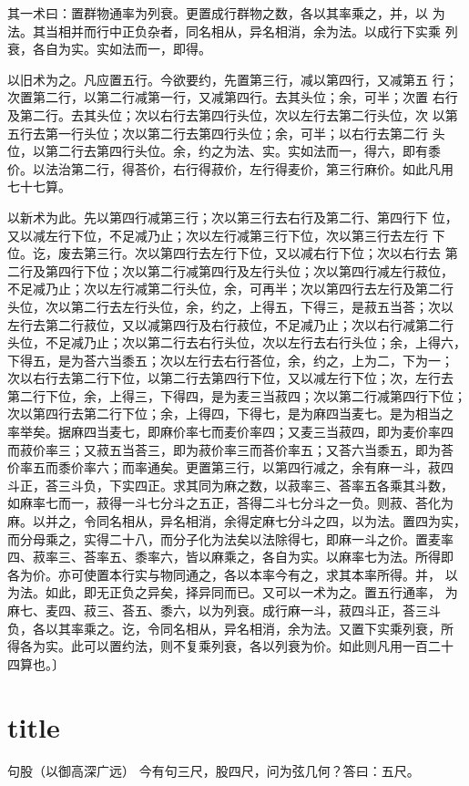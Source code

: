 \documentclass[a4paper,12pt,UTF8,twoside]{ctexbook}
\begin{document}
其一术曰：置群物通率为列衰。更置成行群物之数，各以其率乘之，并，以 为法。其当相并而行中正负杂者，同名相从，异名相消，余为法。以成行下实乘 列衰，各自为实。实如法而一，即得。

以旧术为之。凡应置五行。今欲要约，先置第三行，减以第四行，又减第五 行；次置第二行，以第二行减第一行，又减第四行。去其头位；余，可半；次置 右行及第二行。去其头位；次以右行去第四行头位，次以左行去第二行头位，次 以第五行去第一行头位；次以第二行去第四行头位；余，可半；以右行去第二行 头位，以第二行去第四行头位。余，约之为法、实。实如法而一，得六，即有黍 价。以法治第二行，得荅价，右行得菽价，左行得麦价，第三行麻价。如此凡用 七十七算。

以新术为此。先以第四行减第三行；次以第三行去右行及第二行、第四行下 位，又以减左行下位，不足减乃止；次以左行减第三行下位，次以第三行去左行 下位。讫，废去第三行。次以第四行去左行下位，又以减右行下位；次以右行去 第二行及第四行下位；次以第二行减第四行及左行头位；次以第四行减左行菽位， 不足减乃止；次以左行减第二行头位，余，可再半；次以第四行去左行及第二行 头位，次以第二行去左行头位，余，约之，上得五，下得三，是菽五当荅；次以 左行去第二行菽位，又以减第四行及右行菽位，不足减乃止；次以右行减第二行 头位，不足减乃止；次以第二行去右行头位，次以左行去右行头位；余，上得六， 下得五，是为荅六当黍五；次以左行去右行荅位，余，约之，上为二，下为一； 次以右行去第二行下位，以第二行去第四行下位，又以减左行下位；次，左行去 第二行下位，余，上得三，下得四，是为麦三当菽四；次以第二行减第四行下位； 次以第四行去第二行下位；余，上得四，下得七，是为麻四当麦七。是为相当之 率举矣。据麻四当麦七，即麻价率七而麦价率四；又麦三当菽四，即为麦价率四 而菽价率三；又菽五当荅三，即为菽价率三而荅价率五；又荅六当黍五，即为荅 价率五而黍价率六；而率通矣。更置第三行，以第四行减之，余有麻一斗，菽四 斗正，荅三斗负，下实四正。求其同为麻之数，以菽率三、荅率五各乘其斗数， 如麻率七而一，菽得一斗七分斗之五正，荅得二斗七分斗之一负。则菽、荅化为 麻。以并之，令同名相从，异名相消，余得定麻七分斗之四，以为法。置四为实， 而分母乘之，实得二十八，而分子化为法矣以法除得七，即麻一斗之价。置麦率 四、菽率三、荅率五、黍率六，皆以麻乘之，各自为实。以麻率七为法。所得即 各为价。亦可使置本行实与物同通之，各以本率今有之，求其本率所得。并， 以为法。如此，即无正负之异矣，择异同而已。又可以一术为之。置五行通率， 为麻七、麦四、菽三、荅五、黍六，以为列衰。成行麻一斗，菽四斗正，荅三斗 负，各以其率乘之。讫，令同名相从，异名相消，余为法。又置下实乘列衰，所 得各为实。此可以置约法，则不复乘列衰，各以列衰为价。如此则凡用一百二十 四算也。〕 

\chapter{title}
句股（以御高深广远） 今有句三尺，股四尺，问为弦几何？答曰：五尺。
\end{document}
